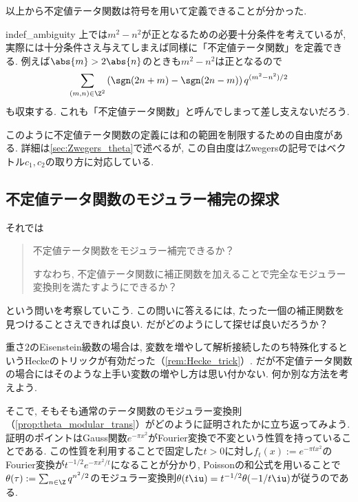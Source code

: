 \documentclass[11pt,b5paper,oneside,lualatex]{ltjsarticle} %
\numberwithin{equation}{section} %
\begin{document}
以上から不定値テータ関数は符号を用いて定義できることが分かった. 

\begin{rem}{}{indef_ambiguity}
	上では$ m^2 - n^2 $が正となるための必要十分条件を考えているが, 実際には十分条件さえ与えてしまえば同様に「不定値テータ関数」を定義できる. 
	例えば$ \abs{m} > 2\abs{n} $のときも$ m^2 - n^2 $は正となるので
	\[
	\sum_{(m, n) \in \Z^2} \left( \sgn(2n+m) - \sgn(2n-m) \right) q^{(m^2 - n^2)/2}
	\]
	も収束する. 
	これも「不定値テータ関数」と呼んでしまって差し支えないだろう. 
	
	このように不定値テータ関数の定義には和の範囲を制限するための自由度がある. 
	詳細は\cref{sec:Zwegers_theta}で述べるが, この自由度はZwegersの記号ではベクトル$ c_1, c_2 $の取り方に対応している. 
\end{rem}



\subsection{不定値テータ関数のモジュラー補完の探求} \label{subsec:modular_completion}


それでは
\begin{quote}
	\centering
	不定値テータ関数をモジュラー補完できるか？
	
	すなわち, 不定値テータ関数に補正関数を加えることで完全なモジュラー変換則を満たすようにできるか？
\end{quote}
という問いを考察していこう. 
この問いに答えるには, たった一個の補正関数を見つけることさえできれば良い. 
だがどのようにして探せば良いだろうか？

重さ$ 2 $のEisenstein級数の場合は, 変数を増やして解析接続したのち特殊化するというHeckeのトリックが有効だった（\cref{rem:Hecke_trick}）. 
だが不定値テータ関数の場合にはそのような上手い変数の増やし方は思い付かない. 
何か別な方法を考えよう. 

そこで, そもそも通常のテータ関数のモジュラー変換則（\cref{prop:theta_modular_trans}）がどのように証明されたかに立ち返ってみよう. 
証明のポイントはGauss関数$ e^{-\pi x^2} $がFourier変換で不変という性質を持っていることである. 
この性質を利用することで固定した$ t > 0 $に対し$ f_t (x) := e^{-\pi t x^2} $のFourier変換が$ t^{-1/2} e^{-\pi  x^2/t} $になることが分かり, Poissonの和公式を用いることで$ \theta (\tau) := \sum_{n \in \Z} q^{n^2/2} $のモジュラー変換則$ \theta (t\iu) = t^{-1/2} \theta (-1/t\iu) $が従うのである. 
\end{document}
